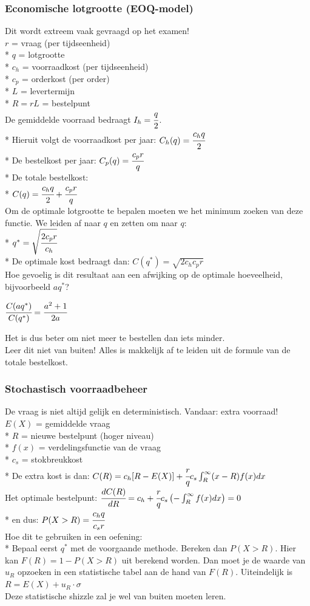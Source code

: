 \documentclass[12pt]{article}
\begin{document}
\subsubsection{Economische lotgrootte (EOQ-model)}
Dit wordt extreem vaak gevraagd op het examen!\\
$r$ = vraag (per tijdseenheid)\\*
$q$ = lotgrootte\\*
$c_h$ = voorraadkost (per tijdseenheid)\\*
$c_p$ = orderkost (per order)\\*
$L$ = levertermijn\\*
$R = rL$ = bestelpunt\\
De gemiddelde voorraad bedraagt $I_h = \cfrac{q}{2}$.\\*
Hieruit volgt de voorraadkost per jaar: $C_h(q) = \cfrac{c_hq}{2}$\\*
De bestelkost per jaar: $C_p(q) = \cfrac{c_pr}{q}$\\*
De totale bestelkost:\\*
$C(q) = \cfrac{c_hq}{2} + \cfrac{c_pr}{q}$\\
Om de optimale lotgrootte te bepalen moeten we het minimum zoeken van deze functie. We leiden af naar $q$ en zetten om naar $q$:\\*
$q^* = \sqrt{\cfrac{2c_pr}{c_h}}$\\*
De optimale kost bedraagt dan: $C(q^*) = \sqrt{2c_hc_pr}$\\
Hoe gevoelig is dit resultaat aan een afwijking op de optimale hoeveelheid, bijvoorbeeld $aq^*$?
\begin{center}
$\cfrac{C(aq^*)}{C(q^*)} = \cfrac{a^2+1}{2a}$
\end{center}
Het is dus beter om niet meer te bestellen dan iets minder.\\
Leer dit niet van buiten! Alles is makkelijk af te leiden uit de formule van de totale bestelkost.
\subsubsection{Stochastisch voorraadbeheer}
De vraag is niet altijd gelijk en deterministisch. Vandaar: extra voorraad!\\
$E(X)$ = gemiddelde vraag\\*
$R$ = nieuwe bestelpunt (hoger niveau)\\*
$f(x)$ = verdelingsfunctie van de vraag\\*
$c_s$ = stokbreukkost\\*
De extra kost is dan: $C(R) = c_h[R-E(X)] + \cfrac{r}{q}c_s\int_R^\infty(x-R)f(x)dx$\\
Het optimale bestelpunt: $\cfrac{dC(R)}{dR} = c_h + \cfrac{r}{q}c_s\left(-\int_R^\infty f(x)dx\right) = 0$\\*
en dus: $P(X>R) = \cfrac{c_hq}{c_sr}$\\
Hoe dit te gebruiken in een oefening:\\*
Bepaal eerst $q^*$ met de voorgaande methode. Bereken dan $P(X>R)$. Hier kan $F(R) = 1-P(X>R)$ uit berekend worden. Dan moet je de waarde van $u_R$ opzoeken in een statistische tabel aan de hand van $F(R)$. Uiteindelijk is $R = E(X) + u_R \cdot \sigma$\\
Deze statistische shizzle zal je wel van buiten moeten leren.
\end{document}
